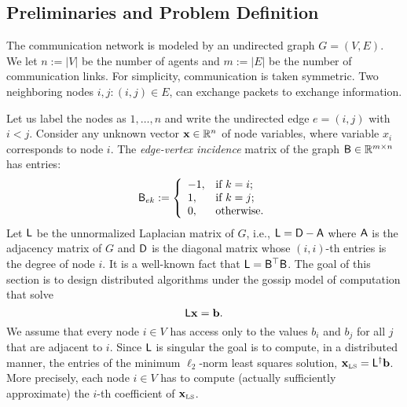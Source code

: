 \subsection{Preliminaries and Problem Definition}
%
The communication network is modeled by an undirected graph $G = (V,E)$. We let $n:=|V|$ be the number of agents and $m:=|E|$ be the number of communication links. For simplicity, communication is taken symmetric. Two neighboring nodes $i,j: (i,j)\in E$, can exchange packets to exchange information.
%

%
Let us label the nodes as $1,\ldots, n$ and write the undirected edge $e=(i,j)$ with $i<j$.  Consider any unknown vector $\mathbf{x} \in \mathbb{R}^n$ of node variables, where variable $x_i$ corresponds to node $i$. The \emph{edge-vertex incidence} matrix of the graph ${\mathsf{B} }\in \mathbb{R}^{m \times n}$ has entries:
%
\begin{equation}
{\ensuremath{\mathsf{B} }}_{ek} :=
\left\{
  \begin{array}{ll}
    -1, & \hbox{if $k=i$;} \\
    1, & \hbox{if $k=j$;} \\
    0, & \hbox{otherwise}.
  \end{array}
\right.
\end{equation}
%
Let ${\mathsf{L} }$ be the unnormalized Laplacian matrix of $G$, i.e., ${\mathsf{L} }={\mathsf{D} } - {\mathsf{A} }$ where ${\mathsf{A} }$ is the adjacency matrix of $G$ and ${\mathsf{D} }$ is the diagonal matrix whose $(i,i)$-th entries is the degree of node $i$. It is a well-known fact that ${\mathsf{L} }= {\mathsf{B} }^\top {\ensuremath{\mathsf{B} }}$. The goal of this section is to design distributed algorithms under the gossip model of computation that solve
\[{\mathsf{L} } \mathbf{x} = {\mathbf b}.\]
We assume that every node $i\in V$ has access only to the values $b_i$ and $b_j $ for all $j$ that are adjacent to $i$. Since ${\mathsf{L} }$ is singular the goal is to compute, in a distributed manner, the entries of the minimum $\ell_2$-norm least squares solution, $\mathbf{x}_{\textrm{\tiny LS}} = {{\mathsf{L} }}^\dagger {\mathbf b}$. More precisely, each node $i\in V$ has to compute (actually sufficiently approximate) the $i$-th coefficient of $\mathbf{x}_{\textrm{\tiny LS}}$.
%
